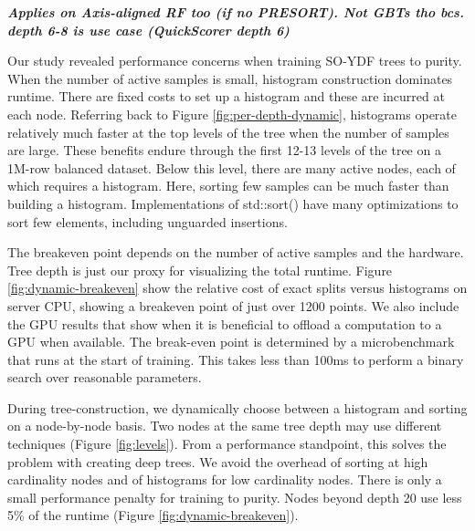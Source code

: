 \documentclass[sigconf,anonymous,review]{acmart}
\begin{document}
\textbf{\textit{Applies on Axis-aligned RF too (if no PRESORT). Not GBTs tho bcs. depth 6-8 is use case (QuickScorer depth 6)}}

Our study revealed performance concerns when training SO-YDF trees to purity. When the number of active samples is small, histogram construction dominates runtime. There are fixed costs to set up a histogram and these are incurred at each node. Referring back to Figure \ref{fig:per-depth-dynamic}, histograms operate relatively much faster at the top levels of the tree when the number of samples are large. These benefits endure through the first 12-13 levels of the tree on a 1M-row balanced dataset. Below this level, there are many active nodes, each of which requires a histogram. Here, sorting few samples can be much faster than building a histogram. Implementations of {\sf std::sort()} have many optimizations to sort few elements, including unguarded insertions.

The  breakeven point depends on the number of active samples and the  hardware. Tree depth is just our proxy for visualizing the total runtime. Figure \ref{fig:dynamic-breakeven} show the relative cost of exact splits versus histograms on server CPU, showing a breakeven point of just over 1200 points. We also include the GPU results that show when it is beneficial to offload a computation to a GPU when available. The break-even point is determined by a microbenchmark that runs at the start of training. This takes less than 100ms to perform a binary search over reasonable parameters.

During tree-construction, we dynamically choose between a histogram and sorting on a node-by-node basis. Two nodes at the same tree depth may use different techniques (Figure \ref{fig:levels}). From a performance standpoint, this solves the problem with creating deep trees.  We avoid the overhead of sorting at high cardinality nodes and of histograms for low cardinality nodes. There is only a small performance penalty for training to purity.  Nodes beyond depth 20 use less 5\% of the runtime (Figure \ref{fig:dynamic-breakeven}).


\end{document}
